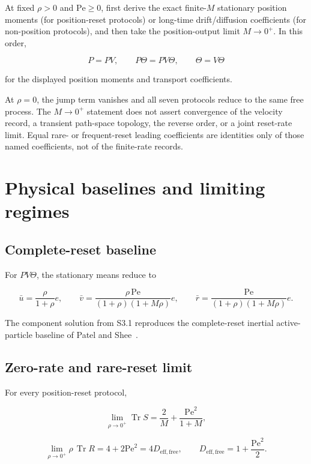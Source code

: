 At fixed \(\rho>0\) and \(\mathrm{Pe}\ge0\), first derive the exact finite-\(M\) stationary position moments (for position-reset protocols) or long-time drift/diffusion coefficients (for non-position protocols), and then take the position-output limit \(M\to0^+\). In this order,

\[
P=PV,\qquad
P\Theta=PV\Theta,\qquad
\Theta=V\Theta
\]

for the displayed position moments and transport coefficients.

At \(\rho=0\), the jump term vanishes and all seven protocols reduce to the same free process. The \(M\to0^+\) statement does not assert convergence of the velocity record, a transient path-space topology, the reverse order, or a joint reset-rate limit. Equal rare- or frequent-reset leading coefficients are identities only of those named coefficients, not of the finite-rate records.



\section{Physical baselines and limiting regimes}\label{s6.-mandatory-baselines-and-limits}

\subsection{Complete-reset baseline}\label{s6.1-complete-reset-baseline}

For \(PV\Theta\), the stationary means reduce to

\[
\bar u=\frac{\rho}{1+\rho}e,\qquad
\bar v=\frac{\rho\,\mathrm{Pe}}
{(1+\rho)(1+M\rho)}e,\qquad
\bar r=\frac{\mathrm{Pe}}
{(1+\rho)(1+M\rho)}e.
\]

The component solution from S3.1 reproduces the complete-reset inertial active-particle baseline of Patel and Shee~\cite{PatelShee}.

\subsection{Zero-rate and rare-reset limit}\label{s6.2-zero-rate-and-rare-reset-limit}

For every position-reset protocol,

\[
\lim_{\rho\to0^+}\operatorname{Tr}S
=\frac{2}{M}+\frac{\mathrm{Pe}^2}{1+M},
\]

\[
\lim_{\rho\to0^+}\rho\,\operatorname{Tr}R
=4+2\mathrm{Pe}^2
=4D_{\mathrm{eff,free}},
\qquad
D_{\mathrm{eff,free}}=1+\frac{\mathrm{Pe}^2}{2}.
\]

